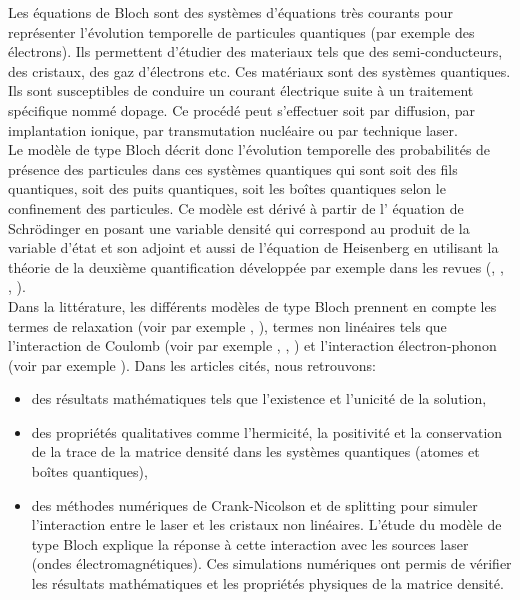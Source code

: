 \documentclass[12pt,a4paper,openany,oneside]{book}
\begin{document}
Les équations de Bloch sont des systèmes d'équations très courants pour représenter l'évolution temporelle de particules quantiques (par exemple des électrons). Ils permettent d'étudier des materiaux tels que des semi-conducteurs, des cristaux, des gaz d'électrons etc. Ces matériaux sont des systèmes quantiques. Ils sont susceptibles de conduire un courant électrique suite à un traitement spécifique nommé dopage. Ce procédé peut s’effectuer soit par diffusion, par implantation ionique, par transmutation nucléaire ou par technique laser.\\
Le modèle de type Bloch décrit donc l'évolution temporelle des probabilités de présence des particules dans ces systèmes quantiques qui sont soit des ﬁls quantiques, soit des puits quantiques, soit les boîtes quantiques selon le confinement des particules. 
Ce modèle est dérivé à partir de l' équation de Schrödinger en posant une variable densité qui correspond au produit de la variable d'état et son adjoint et aussi de l'équation de Heisenberg en utilisant la théorie de la deuxième quantification développée par exemple dans les revues (\cite{mareference1}, \cite{mareference11}, \cite{mareference10}, \cite{mareference5}).\\                                                                                 Dans la littérature, les différents modèles de type Bloch prennent en compte les termes de relaxation (voir par exemple \cite{mareference2}, \cite{mareference4}), termes non linéaires tels que l'interaction de Coulomb (voir par exemple \cite{mareference6}, \cite{mareference7}, \cite{mareference10}) et l'interaction électron-phonon (voir par exemple \cite{mareference9}). Dans les articles cités, nous retrouvons: 
\begin{itemize}[label=$\bullet$]
\item des résultats mathématiques tels que l'existence et l'unicité de la solution,
\item des propriétés qualitatives comme l'hermicité, la positivité  et la conservation de la trace de la matrice densité dans les systèmes quantiques (atomes et boîtes quantiques),
\item des méthodes numériques de Crank-Nicolson et de splitting pour simuler l'interaction entre le laser et les cristaux non linéaires.
L'étude du modèle de type Bloch explique la réponse à cette interaction avec les sources laser (ondes électromagnétiques). Ces simulations numériques ont permis de vérifier les résultats mathématiques et les propriétés physiques de la matrice densité.
\end{itemize}
\end{document}
